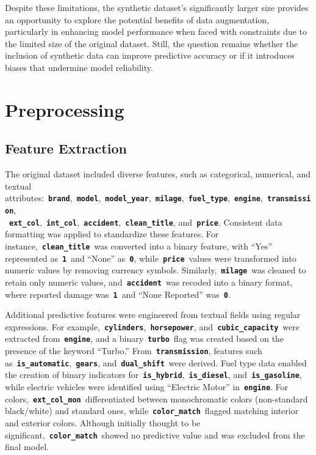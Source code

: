 \documentclass[a4paper,oneside,bibliography=totoc]{scrbook}
\begin{document}
Despite these limitations, the synthetic dataset's significantly larger size provides an opportunity to explore the potential benefits of data augmentation, particularly in enhancing model performance when faced with constraints due to the limited size of the original dataset. Still, the question remains whether the inclusion of synthetic data can improve predictive accuracy or if it introduces biases that undermine model reliability.


\chapter{Preprocessing}
\label{cha:preprocessing}

\section{Feature Extraction}
\label{sec:featureExtraction}

The original dataset included diverse features, such as categorical, numerical, and textual attributes:~\textbf{\texttt{brand}},~\textbf{\texttt{model}},~\textbf{\texttt{model\_year}},~\textbf{\texttt{milage}},~\textbf{\texttt{fuel\_type}},~\textbf{\texttt{engine}},~\textbf{\texttt{transmission}},\\~\textbf{\texttt{ext\_col}},~\textbf{\texttt{int\_col}},~\textbf{\texttt{accident}},~\textbf{\texttt{clean\_title}}, and~\textbf{\texttt{price}}. Consistent data formatting was applied to standardize these features. For instance,~\textbf{\texttt{clean\_title}}~was converted into a binary feature, with ``Yes'' represented as~\textbf{\texttt{1}}~and ``None'' as~\textbf{\texttt{0}}, while~\textbf{\texttt{price}}~values were transformed into numeric values by removing currency symbols. Similarly,~\textbf{\texttt{milage}}~was cleaned to retain only numeric values, and~\textbf{\texttt{accident}}~was recoded into a binary format, where reported damage was~\textbf{\texttt{1}}~and ``None Reported'' was~\textbf{\texttt{0}}.

Additional predictive features were engineered from textual fields using regular expressions. For example,~\textbf{\texttt{cylinders}},~\textbf{\texttt{horsepower}}, and~\textbf{\texttt{cubic\_capacity}}~were extracted from~\textbf{\texttt{engine}}, and a binary~\textbf{\texttt{turbo}}~flag was created based on the presence of the keyword ``Turbo.'' From~\textbf{\texttt{transmission}}, features such as~\textbf{\texttt{is\_automatic}},~\textbf{\texttt{gears}}, and~\textbf{\texttt{dual\_shift}}~were derived. Fuel type data enabled the creation of binary indicators for~\textbf{\texttt{is\_hybrid}},~\textbf{\texttt{is\_diesel}}, and~\textbf{\texttt{is\_gasoline}}, while electric vehicles were identified using ``Electric Motor'' in~\textbf{\texttt{engine}}. For colors,~\textbf{\texttt{ext\_col\_mon}}~differentiated between monochromatic colors (non-standard black/white) and standard ones, while~\textbf{\texttt{color\_match}}~flagged matching interior and exterior colors. Although initially thought to be significant,~\textbf{\texttt{color\_match}}~showed no predictive value and was excluded from the final model.
\end{document}
